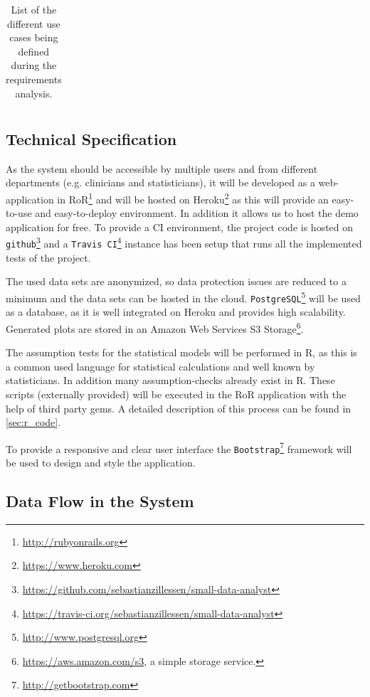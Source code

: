 \begin{landscape}
\begin{longtable}{ l l p{11cm} l l p{3cm} }
		\caption{List of the different use cases being defined during the requirements analysis.}	
		\label{tab:usecases}
	\end{longtable}
\end{landscape}






\subsection{Technical Specification}
\label{sub:technical}

As the system should be accessible by multiple users and from different departments (e.g. clinicians and statisticians), it will be developed as a web-application in \gls{RoR}\footnote{\url{http://rubyonrails.org}} and will be hosted on Heroku\footnote{\url{https://www.heroku.com}} as this will provide an easy-to-use and easy-to-deploy environment. In addition it allows us to host the demo application for free. To provide a \gls{CI} environment, the project code is hosted on \texttt{github}\footnote{\url{https://github.com/sebastianzillessen/small-data-analyst}} and a \texttt{Travis CI}\footnote{\url{https://travis-ci.org/sebastianzillessen/small-data-analyst}} instance has been setup that runs all the implemented tests of the project.

The used data sets are anonymized, so data protection issues are reduced to a minimum and the data sets can be hosted in the cloud. \texttt{PostgreSQL}\footnote{\url{http://www.postgresql.org}} will be used as a database, as it is well integrated on Heroku and provides high scalability. Generated plots are stored in an Amazon Web Services S3 Storage\footnote{\url{https://aws.amazon.com/s3}, a simple storage service.}.

The assumption tests for the statistical models will be performed in \gls{R}, as this is a common used language for statistical calculations and well known by statisticians. In addition many assumption-checks already exist in \gls{R}. These scripts (externally provided) will be executed in the \gls{RoR} application with the help of third party gems. A detailed description of this process can be found in \autoref{sec:r_code}.

To provide a responsive and clear user interface the \texttt{Bootstrap}\footnote{\url{http://getbootstrap.com}} framework will be used to design and style the application. 

\subsection{Data Flow in the System}


